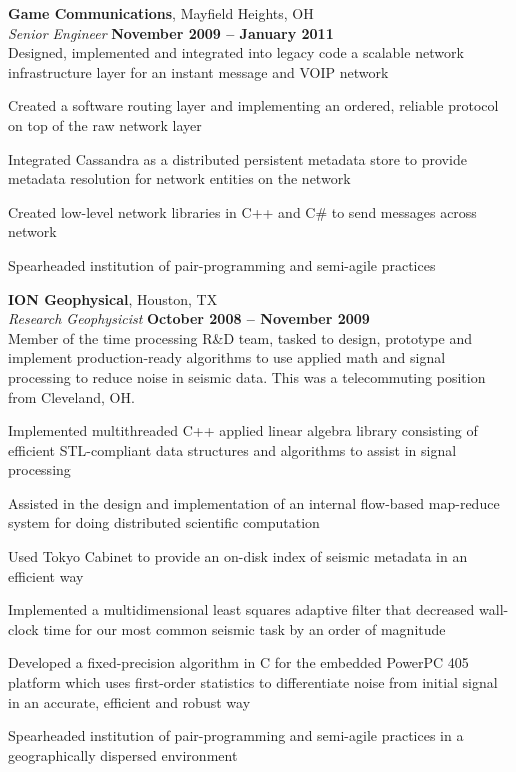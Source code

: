 \documentclass[margin,line,12pt]{resume}
\begin{document}
\begin{resume}
    \textbf{Game Communications}, Mayfield Heights, OH \vspace{2mm}\\\vspace{1mm}%
    \textsl{Senior Engineer} \hfill \textbf{November 2009 -- January 2011}\\
    Designed, implemented and integrated into legacy code a scalable network infrastructure layer for an instant message and VOIP network
    \begin{list2}
    \item Created a software routing layer and implementing an ordered, reliable protocol on top of the raw network layer
    \item Integrated Cassandra as a distributed persistent metadata store to provide metadata resolution for network entities on the network
    \item Created low-level network libraries in C++ and C\# to send messages across network
    \item Spearheaded institution of pair-programming and semi-agile practices
    \end{list2}
    \textbf{ION Geophysical}, Houston, TX \vspace{2mm}\\\vspace{1mm}%
    \textsl{Research Geophysicist} \hfill \textbf{October 2008 -- November 2009}\\
    Member of the time processing R\&D team, tasked to design, prototype and implement production-ready algorithms to use applied math and signal processing to reduce noise in seismic data.  This was a telecommuting position from Cleveland, OH.
    \begin{list2}
    \item Implemented multithreaded C++ applied linear algebra library consisting of efficient STL-compliant data structures and algorithms to assist in signal processing
    \item Assisted in the design and implementation of an internal flow-based map-reduce system for doing distributed scientific computation
    \item Used Tokyo Cabinet to provide an on-disk index of seismic metadata in an efficient way
    \item Implemented a multidimensional least squares adaptive filter that decreased wall-clock time for our most common seismic task by an order of magnitude
    \item Developed a fixed-precision algorithm in C for the embedded PowerPC 405 platform which uses first-order statistics to differentiate noise from initial signal in an accurate, efficient and robust way
    \item Spearheaded institution of pair-programming and semi-agile practices in a geographically dispersed environment
    \end{list2}


\end{resume}
\end{document}

